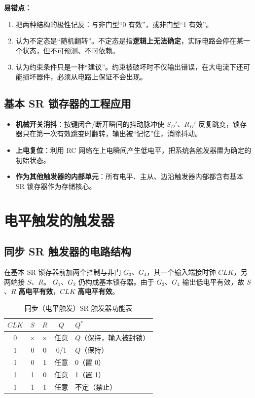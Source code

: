\noindent\textbf{易错点：}
\begin{enumerate}
    \item 把两种结构的极性记反：与非门型“0 有效”，或非门型“1 有效”。
    \item 认为不定态是“随机翻转”。不定态是指\textbf{逻辑上无法确定}，实际电路会停在某一个状态，但不可预测、不可依赖。
    \item 认为约束条件只是一种“建议”。约束被破坏时不仅输出错误，在大电流下还可能损坏器件，必须从电路上保证不会出现。
\end{enumerate}

\subsection{基本 SR 锁存器的工程应用}
\begin{itemize}
    \item \textbf{机械开关消抖}：按键闭合/断开瞬间的抖动脉冲使 $S_D'$、$R_D'$ 反复跳变，锁存器只在第一次有效跳变时翻转，输出被“记忆”住，消除抖动。
    \item \textbf{上电复位}：利用 RC 网络在上电瞬间产生低电平，把系统各触发器置为确定的初始状态。
    \item \textbf{作为其他触发器的内部单元}：所有电平、主从、边沿触发器内部都含有基本 SR 锁存器作为存储核心。
\end{itemize}

\section{电平触发的触发器}
\subsection{同步 SR 触发器的电路结构}
在基本 SR 锁存器前加两个控制与非门 $G_3$、$G_4$，其一个输入端接时钟 $CLK$，另两端接 $S$、$R$。
$G_1$、$G_2$ 仍构成基本锁存器。由于 $G_3$、$G_4$ 输出低电平有效，故 $S$、$R$ \textbf{高电平有效}，$CLK$ \textbf{高电平有效}。

\begin{table}[!htbp]
\centering
\caption{同步（电平触发）SR 触发器功能表}
\begin{tabular}{cc|cc|l}
\toprule
$CLK$ & $S$ & $R$ & $Q$ & $Q^*$ \\
\midrule
0 & $\times$ & $\times$ & 任意 & $Q$（保持，输入被封锁） \\
1 & 0 & 0 & 0/1 & $Q$（保持） \\
1 & 0 & 1 & 任意 & 0（置 0） \\
1 & 1 & 0 & 任意 & 1（置 1） \\
1 & 1 & 1 & 任意 & 不定（禁止） \\
\bottomrule
\end{tabular}
\end{table}


